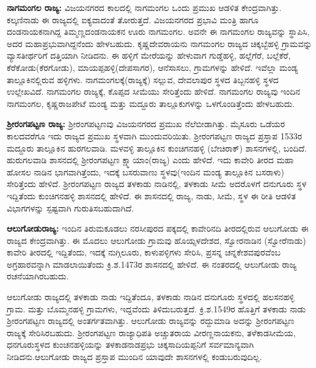 \textbf{ನಾಗಮಂಗಲ ರಾಜ್ಯ:} ವಿಜಯನಗರದ ಕಾಲದಲ್ಲಿ ನಾಗಮಂಗಲ ಒಂದು ಪ್ರಮುಖ ಆಡಳಿತ ಕೇಂದ್ರವಾಗಿತ್ತು. ಕಲ್ಕಣಿನಾಡು ಈ ರಾಜ್ಯದಲ್ಲಿ ಐಕ್ಯವಾದಂತೆ ತೋರುತ್ತದೆ. ವಿಜಯನಗರದ ಪ್ರಭಾವಿ ಮಂತ್ರಿ ಹಾಗೂ ದಂಡನಾಯಕನಾಗಿದ್ದ ತಿಮ್ಮಣ್ಣದಂಡನಾಯಕನ ಊರು ನಾಗಮಂಗಲ. ಅವನೇ ಈ ನಾಗಮಂಗಲ ರಾಜ್ಯವನ್ನು ಸ್ಥಾಪಿಸಿ, ಅದರ ಮಹಾಪ್ರಭು\-ವಾಗಿದ್ದನೆಂದು ಹೇಳಬಹುದು. ಕೃಷ್ಣದೇವರಾಯನು ನಾಗಮಂಗಲ ರಾಜ್ಯದ ಚಿಕ್ಕಬ್ಬೆಹಳ್ಳಿ ಗ್ರಾಮವನ್ನು ವ್ಯಾಸತೀರ್ಥರಿಗೆ ದತ್ತಿಯಾಗಿ ನೀಡಿದನು. ಈ ಹಳ್ಳಿಗೆ ಮೇರೆಯನ್ನು ಹೇಳುವಾಗ ಗುಡ್ಡೆಹಳ್ಳಿ, ಹಲ್ಲೆಗೆರೆ, ಬಲ್ಲೆಕೆರೆ, ಕೆರೆಕೋಡು(ಕೆರಗೋಡು), ಮಾಯಪ್ಪಹಳ್ಳಿ(ದೇಪಸಾಗರ), ಆನೆಸಾಸಲು, ಗ್ರಾಮಗಳನ್ನು ಹೇಳಿದೆ. ಇವೆಲ್ಲಾ ಮಂಡ್ಯ ತಾಲ್ಲೂಕಿನಲ್ಲಿರುವ ಹಳ್ಳಿಗಳು. ನಾಗಮಂಗಲಕ್ಕೆ(ರಾಜ್ಯಕ್ಕೆ) ಸಲ್ಲುವ, ದೇವಲಾಪುರ ಸ್ಥಳದ ತಿಬ್ಬನಹಳ್ಳಿ ಸ್ಥಳದ ಉಲ್ಲೇಖವಿದೆ. ನಾಗಮಂಗಲ ರಾಜ್ಯಕ್ಕೆ, ಕೊಪ್ಪದ ಸೀಮೆಯು ಸೇರಿತ್ತೆಂದು ಹೇಳಿದೆ. ನಾಗಮಂಗಲ ರಾಜ್ಯವು ಇಂದಿನ ನಾಗಮಂಗಲ, ಕೃಷ್ಣರಾಜಪೇಟೆ ಮಂಡ್ಯ ಮತ್ತು ಮದ್ದೂರು ತಾಲ್ಲೂಕುಗಳನ್ನು ಒಳಗೊಂಡಿತ್ತೆಂದು ಹೇಳಬಹುದು.

\textbf{ಶ‍್ರೀರಂಗಪಟ್ಟಣ ರಾಜ್ಯ:} ಶ‍್ರೀರಂಗಪಟ್ಟಣವು ವಿಜಯನಗರದ ಪ್ರಮುಖ ನೆಲೆಬೀಡಾಗಿತ್ತು. ಮೈಸೂರು ಒಡೆಯರ ಕಾಲದವರೆಗೂ ಇದು ರಾಜ್ಯದ ಪ್ರಮುಖ ಸ್ಥಳವಾಗಿ ಮುಂದುವರಿಯಿತು. ಶ‍್ರೀರಂಗಪಟ್ಟಣ ರಾಜ್ಯದ ಪ್ರಸ್ತಾಪ 1533ರ ಮದ್ದೂರು ತಾಲ್ಲೂಕಿನ ಹುರಗಲವಾಡಿ. ಮಳವಳ್ಳಿ ತಾಲ್ಲೂಕಿನ ಕುಂಚಿಗನಹಳ್ಳಿ (ಬೇಚಿರಾಕ್​) ಶಾಸನಗಳಲ್ಲಿ, ಬಂದಿದೆ. ಹುರುಗಲವಾಡಿ ಶಾಸನದಲ್ಲಿ ಶ‍್ರೀರಂಗಪಟ್ಟಣ ಕ್ಷ್ಮಾಯಾಂ(ರಾಜ್ಯ) ಎಂದು ಹೇಳಿದೆ. ಇದು ಕಾವೇರಿ ತೀರದ ಮಹಾ ಹೋಸಲ ನಾಡಿನ ಭಾಗವಾಗಿತ್ತೆಂದು, ಇದಕ್ಕೆ ಬಸರುವಾಣು ಸ್ಥಳವು(ಇಂದಿನ ಮಂಡ್ಯ ತಾಲ್ಲೂಕಿನ ಬಸರಾಳು) ಸೇರಿತ್ತೆಂದು ಹೇಳಿದೆ. ಶ‍್ರೀರಂಗಪಟ್ಟಣ ರಾಜ್ಯದ ತಳಕಾಡು ನಾಡಿನಲ್ಲಿ, ತಳಕಾಡು ಸೀಮೆ ಅದರೊಳಗೆ ದನುಗೂರು ಸ್ಥಳ ಇದ್ದಿತೆಂದು ಕುಂಚಿಗನಹಳ್ಳಿ ಶಾಸನದಲ್ಲಿ ಹೇಳಿದೆ. ಈ ಶಾಸನದಲ್ಲಿ ರಾಜ್ಯ, ನಾಡು, ಸೀಮೆ, ಸ್ಥಳ ಈ ರೀತಿ ಆಡಳಿತ ವಿಭಾಗಗಳನ್ನು ಸ್ಪಷ್ಟವಾಗಿ ಗುರುತಿಸಬಹುದಾಗಿದೆ.

\textbf{ಆಲುಗೋಡುರಾಜ್ಯ:} ಇಂದಿನ ತಿರುಮಕೂಡಲು ನರಸೀಪುರದ ಪಕ್ಕದಲ್ಲಿ ಕಾವೇರಿನದಿ ತೀರದಲ್ಲಿರುವ ಆಲುಗೋಡು ಈ ರಾಜ್ಯದ ಕೇಂದ್ರವಾಗಿತ್ತು. ಈ ಮೊದಲು ಆಲುಗೋಡು ಗ್ರಾಮವು ಹೊಯ್ಸಳದೇಶದ, ಸ್ವೋರನಾಡಿನ (ಸ್ವೋರೆನಾಡು) ಕಾವೇರಿ ತೀರದಲ್ಲಿ ಇದ್ದಿತೆಂದು, ಇದಕ್ಕೆ ನುಗ್ಗಿಲೂರು, ಕಾಳುಪಳ್ಳಿಗಳು ಸೇರಿಸಿ, ಪ್ರಸನ್ನ ಚನ್ನಕೇಶವಪುರವೆಂಬ ಅಗ್ರಹಾರವನ್ನಾಗಿ ಮಾಡಲಾಯಿತೆಂದು ಕ್ರಿ.ಶ.1473ರ ಶಾಸನದಲ್ಲಿ ಹೇಳಿದೆ. ಈ ನಂತರದಲ್ಲಿ ಆಲುಗೋಡು ರಾಜ್ಯ ರಚನೆಯಾಗಿರಬಹುದು.

ಆಲುಗೋಡು ರಾಜ್ಯದಲ್ಲಿ ತಳಕಾಡು ನಾಡು ಇದ್ದಿತೆಂದೂ, ತಳಕಾಡು ನಾಡಿನ ದನುಗೂರು ಸ್ಥಳದಲ್ಲಿ ಹಲಸನಹಳ್ಳಿ ಗ್ರಾಮ. ಮತ್ತು ಬೊಮ್ಮನಹಳ್ಳಿ ಗ್ರಾಮಗಳು, ಇದ್ದವೆಂದು ತಿಳಿದುಬರುತ್ತದೆ. ಕ್ರಿ.ಶ.1549ರ ಹೊತ್ತಿಗೆ ತಳಕಾಡು ನಾಡು ಶ‍್ರೀರಂಗಪಟ್ಟಣ ರಾಜ್ಯದಲ್ಲಿ ಅಂತರ್ಗತವಾಗಿತ್ತು. ಆಲುಗೋಡು ರಾಜ್ಯವನ್ನು ರದ್ದುಮಾಡಿ ಅದನ್ನು ಶ‍್ರೀರಂಗಪಟ್ಟಣ ರಾಜ್ಯಕ್ಕೆ ಸೇರಿಸಿರಬಹುದು. ಶ‍್ರೀರಂಗಪಟ್ಟಣ ರಾಜ್ಯಾಧಿಪತಿ ಅಚ್ಚುತರಾಯ ವೀರಣ್ಣನಾಯಕನು, ತಳೆಕಾಡಸೀಮೆಯ, ಧನಗೂರುಸ್ಥಳದ ಕುಂಚನಹಳ್ಳಿಯನ್ನು ತಳಕಾಡನಾಡಪ್ರಭು ಚಿಕ್ಕಸಾದಿಯಪ್ಪನಿಗೆ ಸರ್ವಮಾನ್ಯವಾಗಿ ನೀಡಿದನು.\break ಆಲುಗೋಡು ರಾಜ್ಯದ ಪ್ರಸ್ತಾಪ ಮುಂದಿನ ಯಾವುದೇ ಶಾಸನಗಳಲ್ಲಿ ಕಂಡುಬರುವುದಿಲ್ಲ.

